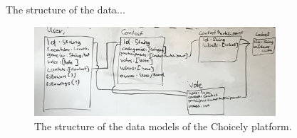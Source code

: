     The structure of the data... 
    \begin{figure}[h] 
		\begin{center}
            \includegraphics[width=0.8\textwidth]{Images/data_structure_whiteboard.jpg}
			\caption{The structure of the data models of the Choicely platform.}
			\label{choicely_data_models}
		\end{center}
    \end{figure}